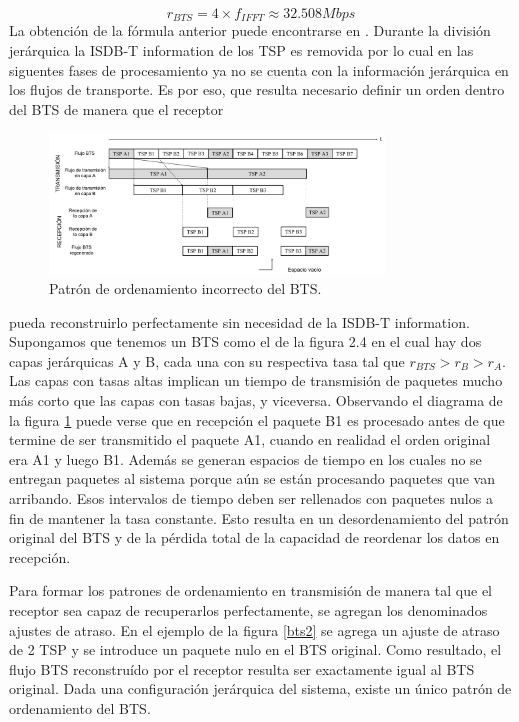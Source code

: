 \documentclass[journal,comsoc]{IEEEtran}
\begin{document}
\begin{equation}
r_{BTS} = 4 \times f_{IFFT} \approx 32.508 Mbps
\end{equation}
La obtención de la fórmula anterior puede encontrarse en \cite{gr-isdbt}.
Durante la división jerárquica la ISDB-T information de los TSP es removida
por lo cual en las siguentes fases de procesamiento ya no se cuenta con la información jerárquica en los flujos de transporte. Es por eso, que resulta necesario definir un orden dentro del BTS de manera que el receptor 

\begin{figure}[!h]
\centering
\includegraphics[width=3.5in]{figuras/bts1}
\caption{Patrón de ordenamiento incorrecto del BTS.}
\label{bts1}
\end{figure}

\noindent pueda reconstruirlo perfectamente sin necesidad de la ISDB-T information. Supongamos que tenemos un BTS como el de la figura 2.4 en el cual hay dos capas jerárquicas A y B, cada una con su respectiva tasa tal que $r_{BTS} > r_B > r_A$. Las capas con tasas altas implican un tiempo de transmisión de paquetes mucho más corto que las capas con tasas bajas, y viceversa. Observando el diagrama de la figura \ref{bts1} puede verse que en recepción el paquete B1 es procesado antes de que termine de ser transmitido el paquete A1, cuando en realidad el orden original era A1 y luego B1. Además se generan espacios de tiempo en los cuales no se entregan paquetes al sistema porque aún se están procesando paquetes que van arribando. Esos intervalos de tiempo deben ser rellenados con paquetes nulos a fin de mantener la tasa constante. Esto resulta en un desordenamiento del patrón original del BTS y de la pérdida total de la capacidad de reordenar los datos en recepción.

Para formar los patrones de ordenamiento en transmisión de manera tal que
el receptor sea capaz de recuperarlos perfectamente, se agregan los denominados ajustes de atraso. En el ejemplo de la figura \ref{bts2} se agrega un ajuste de atraso de 2 TSP y se introduce un paquete nulo en el BTS original. Como resultado, el flujo BTS reconstruído por el receptor resulta ser exactamente igual al BTS original. Dada una configuración jerárquica del sistema, existe un único patrón de ordenamiento del BTS.
\end{document}
